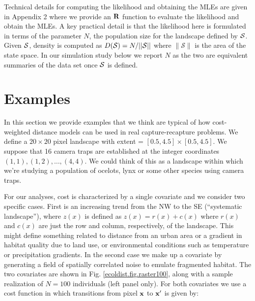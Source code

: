\documentclass[12pt]{article}
\begin{document}
\begin{spacing}{1.8}
Technical details for computing the likelihood and obtaining the MLEs
are given in Appendix 2 where we provide an ${\bf R}$ function
to evaluate the likelihood and obtain the MLEs.
A key practical detail is that the likelihood here is formulated in
terms of the parameter $N$, the population size for the landscape
defined by ${\cal S}$. Given ${\cal S}$, density
is
computed as $D({\cal S}) = N/||{\cal S}||$ where $\|\mathcal{S}\|$ is
the area of the state space. In our simulation study
below we report $N$ as the two are equivalent summaries of the data
set once ${\cal S}$ is defined.


\section{Examples}

In this section we provide examples that we think are typical of how
cost-weighted distance models can be used in real capture-recapture
problems.  We define a $20 \times 20$ pixel landscape with
extent = $[0.5, 4.5] \times [0.5, 4.5]$.
We suppose that 16 camera traps are established at the integer coordinates
$(1,1), (1,2), \ldots, (4,4)$. We could think of this as a landscape
within which we're studying a population of ocelots, lynx or some
other species using camera traps.

For our analyses, cost is characterized by a single covariate
and we consider two specific cases. First is an increasing trend from
the NW to the SE (``systematic landscape''), where $z(x)$ is defined as
$z(x) = r(x) + c(x)$ where $r(x)$ and $c(x)$ are just the row and
column, respectively, of the landscape.  This might define something
related to distance from an urban area or a gradient in habitat
quality due to land use, or environmental conditions such as
temperature or precipitation gradients.  In the second case we make up
a covariate by generating a field of spatially correlated noise to
emulate fragmented habitat.
The two covariates are shown in Fig. \ref{ecoldist.fig.raster100},
along with a sample realization of
$N=100$ individuals (left panel only).  For both covariates we use a
cost function in which transitions from pixel ${\bf x}$ to ${\bf x}'$
is given by:


\end{spacing}
\end{document}
